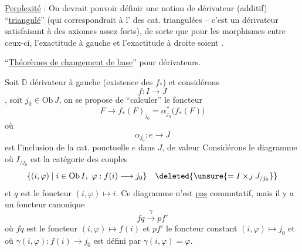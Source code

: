 \uline{Perplexité} : On devrait pouvoir définir une notion de dérivateur (additif) ``\uline{triangulé}'' (qui correspondrait à l' des cat.  triangulées -- c'est un dérivateur satisfaisant à des axiomes assez forts), de sorte que pour les morphismes entre ceux-ci, l'exactitude à gauche et l'exactitude à droite soient \uline{}. 


 

``\uline{Théorèmes de changement de base}'' pour dérivateurs.

Soit $\mathbb D$ dérivateur à gauche (existence des $f_*$) et considérons
\[
f:I\longrightarrow J
\]
, soit $j_0\in\mathrm{Ob}\,J$, on se propose de ``calculer'' le foncteur
\[
F\longrightarrow f_*(F)_{j_0}=\alpha^*_{j_0}\big(f_*(F)\big)
\]
où
\[
\alpha_{j_0}:e\longrightarrow J
\]
est l'inclusion de la cat. ponctuelle $e$ dans $J$, de valeur   
Considérons le diagramme
où $I_{/j_0}$ est la catégorie  des couples
\[
\{(i,\varphi)\mid i\in\mathrm{Ob}\,I,\ \varphi:f(i)\longrightarrow j_0\}
\quad\deleted{\unsure{=I\times_J J_{/j_0}}}
\]
et $q$ est le foncteur $(i,\varphi)\longmapsto i$. Ce diagramme n'est \uline{pas} commutatif, mais il y a un foncteur canonique
\[
fq\xrightarrow{\gamma}pf'
\]
où $fq$ est le foncteur $(i,\varphi)\mapsto f(i)$ et $pf'$ le foncteur constant $(i,\varphi)\longmapsto j_0$ et où $\gamma(i,\varphi):f(i)\longrightarrow j_0$ est défini par $\underline{\gamma(i,\varphi)=\varphi}$.

